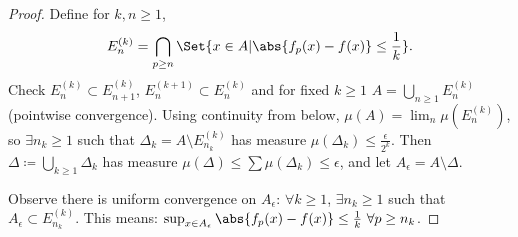 \documentclass[twoside]{article}
\begin{document}
\begin{proof}
    Define for $k, n \geq 1$,
    \begin{equation*}
        E_n^{(k)} = \bigcap_{p \geq n} \Set{x \in A | \abs{f_p(x) - f(x)} \leq \frac{1}{k}}.
    \end{equation*}
    Check $E_n^{(k)} \subset E_{n+1}^{(k)}$, $E_n^{(k+1)} \subset E_n^{(k)}$ and for fixed $k \geq 1$ $A = \bigcup_{n \geq 1} E_n^{(k)}$ (pointwise convergence).
    Using continuity from below, $\mu(A) = \lim_n \mu(E_n^{(k)})$, so $\exists {n_k \geq 1}$ such that $\Delta_k = A \setminus E_{n_k}^{(k)}$ has measure $\mu(\Delta_k) \leq \frac{\epsilon}{2^k}$.
    Then $\Delta \coloneqq \bigcup_{k \geq 1} \Delta_k$ has measure $\mu(\Delta) \leq \sum \mu(\Delta_k) \leq \epsilon$, and let $A_\epsilon = A \setminus \Delta$.

    Observe there is uniform convergence on $A_\epsilon$: $\forall k \geq 1$, $\exists n_k \geq 1$ such that $A_\epsilon \subset E_{n_k}^{(k)}$.
    This means: $\sup_{x \in A_\epsilon} \abs{f_p(x) - f(x)} \leq \frac{1}{k} \ \forall p \geq n_k$.
\end{proof}
\end{document}
